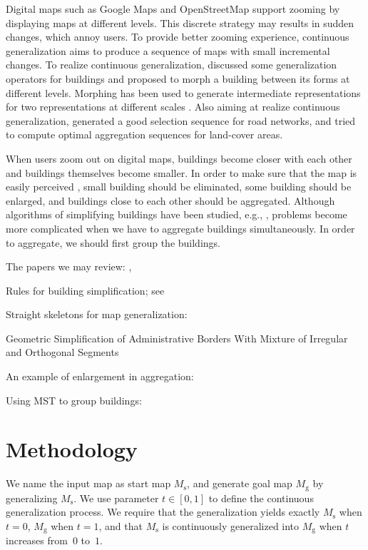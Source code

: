\documentclass[graybox]{svmult}
\newcommand{\maps}{\ensuremath{M_\mathrm{s}}\xspace}
\newcommand{\mapg}{\ensuremath{M_\mathrm{g}}\xspace}
\begin{document}
Digital maps such as Google Maps and OpenStreetMap support zooming by 
displaying maps at different levels. 
This discrete strategy may results in sudden changes, which annoy users.
To provide better zooming experience, continuous generalization aims to 
produce 
a sequence of maps with small incremental changes.
To realize continuous generalization, \textcite{Sester2005_CG} discussed some 
generalization operators for buildings and proposed to morph a building 
between 
its forms at different levels. Morphing has been used to generate intermediate 
representations for two representations at different scales 
\parencite{mnwb-mpstc-08,Peng2013_LSA,Deng2015,Peng2016_Admin}. 
Also aiming at 
realize continuous generalization, \textcite{Chimani2014_Eat} generated a good 
selection sequence for road networks, and 
\textcite{Peng2017_AStar} tried to compute optimal aggregation sequences for 
land-cover areas.

When users zoom out on digital maps, buildings become closer with each other 
and buildings themselves become smaller. 
In order to make sure that the map is 
easily perceived \parencite{Weibel1997}, small building should be eliminated, 
some building should be enlarged, and buildings close to each other should be 
aggregated.
Although algorithms of simplifying buildings have been studied, e.g., 
\textcite{Buchin2011_Simp,haunertwolff2010}, problems become more complicated 
when we have to aggregate buildings simultaneously.
In order to aggregate, we should first group the buildings.





\bigskip

The papers we may review:   
\textcite{vanSmaalen2003, Buchin2016, Chaudhry2008, Stoter2009},

Rules for building simplification; see \textcite{Lee2005}

Straight skeletons for map generalization: 
\textcite{Gold2003,Matuk2006}

Geometric Simplification of Administrative Borders With Mixture 
of
Irregular and Orthogonal Segments \parencite{Samsonov2016}


An example of enlargement in aggregation: 

Using MST to group buildings: \textcite{Zhang2013, 
Cetinkaya2015,Deng2017,Regnauld1996}



\section{Methodology}
We name the input map as start map \maps,
and generate goal map \mapg by generalizing \maps. 
We use parameter $t\in[0,1]$ to define the continuous generalization
process. 
We require that the generalization yields exactly \maps when $t=0$, 
\mapg when $t=1$, 
and that \maps is continuously 
generalized into \mapg when $t$ increases
from~$0$ to~$1$.
\end{document}

